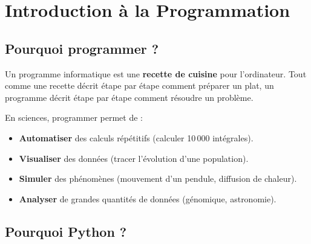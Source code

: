 \chapter{Introduction \`a la Programmation}
\label{ch:intro}

\section{Pourquoi programmer ?}

\begin{intuition}
Un programme informatique est une \textbf{recette de cuisine} pour l'ordinateur. Tout comme une recette d\'ecrit \'etape par \'etape comment pr\'eparer un plat, un programme d\'ecrit \'etape par \'etape comment r\'esoudre un probl\`eme.
\end{intuition}

En sciences, programmer permet de :
\begin{itemize}
\item \textbf{Automatiser} des calculs r\'ep\'etitifs (calculer 10\,000 int\'egrales).
\item \textbf{Visualiser} des donn\'ees (tracer l'\'evolution d'une population).
\item \textbf{Simuler} des ph\'enom\`enes (mouvement d'un pendule, diffusion de chaleur).
\item \textbf{Analyser} de grandes quantit\'es de donn\'ees (g\'enomique, astronomie).
\end{itemize}

\section{Pourquoi Python ?}


\begin{center}
\end{center}


